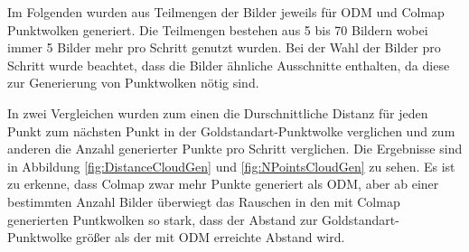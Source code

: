 \documentclass[12pt,titlepage, twoside]{article}
\begin{document}
Im Folgenden wurden aus Teilmengen der Bilder jeweils für ODM und Colmap Punktwolken generiert. Die Teilmengen bestehen aus 5 bis 70 Bildern wobei immer 5 Bilder mehr pro Schritt genutzt wurden.
Bei der Wahl der Bilder pro Schritt wurde beachtet, dass die Bilder ähnliche Ausschnitte enthalten, da diese zur Generierung von Punktwolken nötig sind.

In zwei Vergleichen wurden zum einen die Durschnittliche Distanz für jeden Punkt zum nächsten Punkt in der Goldstandart-Punktwolke verglichen und zum anderen die Anzahl generierter Punkte pro Schritt verglichen.
Die Ergebnisse sind in Abbildung \ref{fig:DistanceCloudGen} und \ref{fig:NPointsCloudGen} zu sehen. 
Es ist zu erkenne, dass Colmap zwar mehr Punkte generiert als ODM, aber ab einer bestimmten Anzahl Bilder überwiegt das Rauschen in den mit Colmap generierten Puntkwolken so stark, dass der Abstand zur Goldstandart-Punktwolke größer als der mit ODM erreichte Abstand wird.
\end{document}
